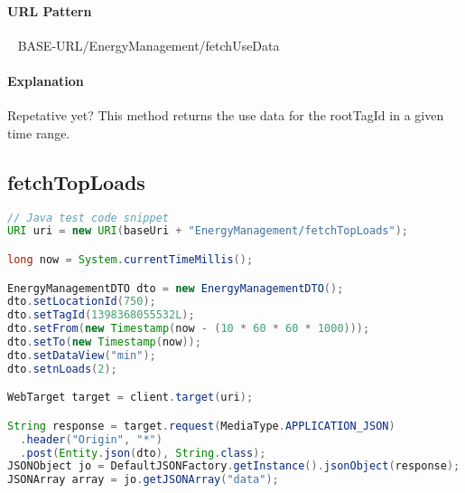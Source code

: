 \documentclass[
10pt, %
letterpaper, %
oneside, %
headinclude,footinclude, %
BCOR5mm, %
]{scrartcl}
\begin{document}
\paragraph{URL Pattern} 
~\newline
BASE-URL/EnergyManagement/fetchUseData

\paragraph{Explanation} Repetative yet? This method returns the use data for the rootTagId in a given time range.


\subsection{\textbf{fetchTopLoads}}

\begin{lstlisting}[language=Java]
// Java test code snippet
URI uri = new URI(baseUri + "EnergyManagement/fetchTopLoads");        

long now = System.currentTimeMillis();

EnergyManagementDTO dto = new EnergyManagementDTO();
dto.setLocationId(750);
dto.setTagId(1398368055532L);
dto.setFrom(new Timestamp(now - (10 * 60 * 60 * 1000)));
dto.setTo(new Timestamp(now));
dto.setDataView("min");
dto.setnLoads(2);

WebTarget target = client.target(uri);

String response = target.request(MediaType.APPLICATION_JSON)
  .header("Origin", "*")
  .post(Entity.json(dto), String.class);
JSONObject jo = DefaultJSONFactory.getInstance().jsonObject(response);
JSONArray array = jo.getJSONArray("data");
\end{lstlisting}

\end{document}
